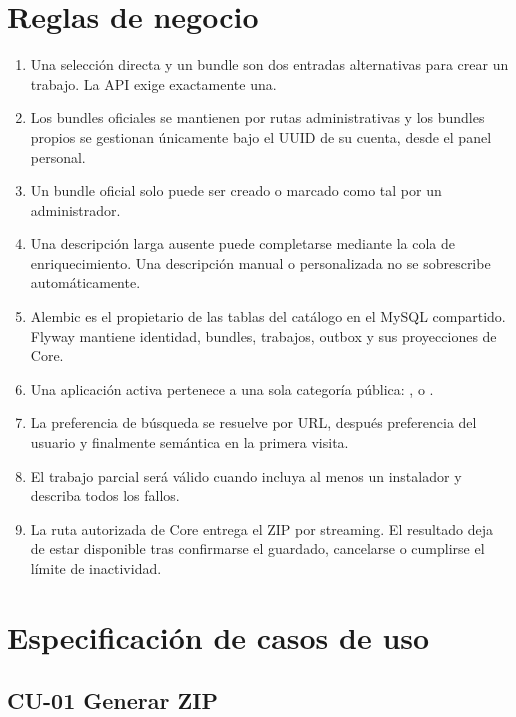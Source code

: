 \section{Reglas de negocio}

\begin{enumerate}
	\item Una selección directa y un bundle son dos entradas alternativas para crear un trabajo. La API exige exactamente una.
	\item Los bundles oficiales se mantienen por rutas administrativas y los bundles propios se gestionan únicamente bajo el UUID de su cuenta, desde el panel personal.
	\item Un bundle oficial solo puede ser creado o marcado como tal por un administrador.
	\item Una descripción larga ausente puede completarse mediante la cola de enriquecimiento. Una descripción manual o personalizada no se sobrescribe automáticamente.
	\item Alembic es el propietario de las tablas del catálogo en el MySQL compartido. Flyway mantiene identidad, bundles, trabajos, outbox y sus proyecciones de Core.
	\item Una aplicación activa pertenece a una sola categoría pública: ,  o .
	\item La preferencia de búsqueda se resuelve por URL, después preferencia del usuario y finalmente semántica en la primera visita.
	\item El trabajo parcial será válido cuando incluya al menos un instalador y describa todos los fallos.
	\item La ruta autorizada de Core entrega el ZIP por streaming. El resultado deja de estar disponible tras confirmarse el guardado, cancelarse o cumplirse el límite de inactividad.
\end{enumerate}

\section{Especificación de casos de uso}

\subsection{CU-01 Generar ZIP}

